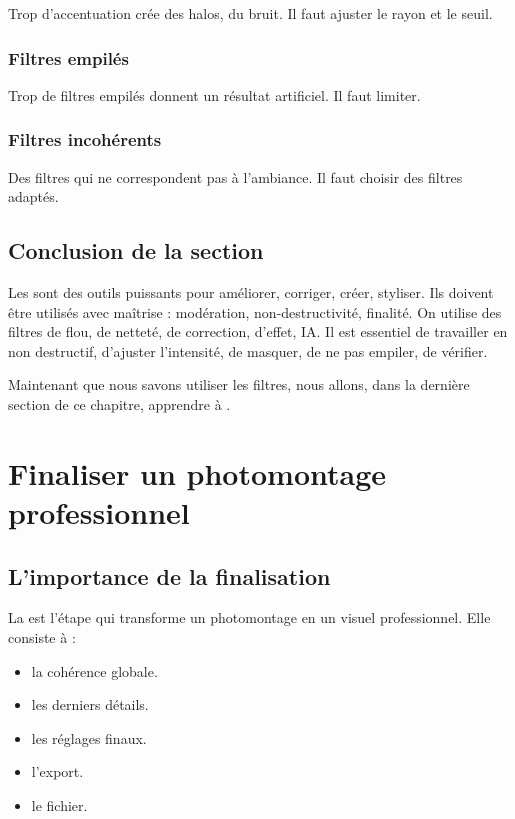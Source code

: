 Trop d'accentuation crée des halos, du bruit. Il faut ajuster le rayon et le seuil.

\subsubsection{Filtres empilés}

Trop de filtres empilés donnent un résultat artificiel. Il faut limiter.

\subsubsection{Filtres incohérents}

Des filtres qui ne correspondent pas à l'ambiance. Il faut choisir des filtres adaptés.

\subsection*{Conclusion de la section}

Les  sont des outils puissants pour améliorer, corriger, créer, styliser. Ils doivent être utilisés avec maîtrise : modération, non-destructivité, finalité. On utilise des filtres de flou, de netteté, de correction, d'effet, IA. Il est essentiel de travailler en non destructif, d'ajuster l'intensité, de masquer, de ne pas empiler, de vérifier.

Maintenant que nous savons utiliser les filtres, nous allons, dans la dernière section de ce chapitre, apprendre à .

\section{Finaliser un photomontage professionnel}

\subsection{L'importance de la finalisation}

La  est l'étape qui transforme un photomontage en un visuel professionnel. Elle consiste à :

\begin{itemize}
    \item {} la cohérence globale.
    \item {} les derniers détails.
    \item {} les réglages finaux.
    \item {} l'export.
    \item {} le fichier.
\end{itemize}

